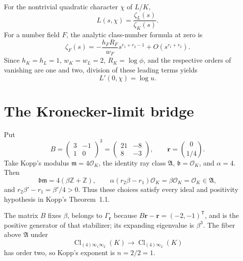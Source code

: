 \documentclass[11pt]{article}
\newcommand{\Z}{\mathbb Z}
\begin{document}
For the nontrivial quadratic character $\chi$ of $L/K$,
\[
 L(s,\chi)=\frac{\zeta_L(s)}{\zeta_K(s)}.
\]
For a number field $F$, the analytic class-number formula at zero is
\[
 \zeta_F(s)=-\frac{h_FR_F}{w_F}s^{r_1+r_2-1}
 +O(s^{r_1+r_2}).
\]
Since $h_K=h_L=1$, $w_K=w_L=2$, $R_K=\log\phi$, and the respective
orders of vanishing are one and two, division of these leading terms
yields
\[
 L'(0,\chi)=\log u.
\]

\section{The Kronecker-limit bridge}

Put
\[
 B=\begin{pmatrix}3&-1\\1&0\end{pmatrix}^{\!3}
 =\begin{pmatrix}21&-8\\8&-3\end{pmatrix},
 \qquad \boldsymbol r=\binom0{1/4}.
\]
Take Kopp's modulus $\mathfrak m=4\mathcal O_K$, the identity ray class
$\mathfrak A$, $\mathfrak b=\mathcal O_K$, and $\alpha=4$.  Then
\[
 \mathfrak b\mathfrak m
 =4(\beta\Z+\Z),\qquad
 \alpha(r_2\beta-r_1)\mathcal O_K
 =\beta\mathcal O_K=\mathcal O_K\in\mathfrak A,
\]
and $r_2\beta'-r_1=\beta'/4>0$.  Thus these choices satisfy every
ideal and positivity hypothesis in Kopp's Theorem~1.1.

The matrix $B$ fixes $\beta$, belongs to
$\Gamma_{\boldsymbol r}$ because
$B\boldsymbol r-\boldsymbol r=(-2,-1)^{\mathsf T}$, and is the positive
generator of that stabilizer; its expanding eigenvalue is $\beta^3$.
The fiber above $\mathfrak A$ under
\[
\operatorname{Cl}_{(4)\infty_1\infty_2}(K)
\longrightarrow\operatorname{Cl}_{(4)\infty_2}(K)
\]
has order two, so Kopp's exponent is $n=2/2=1$.
\end{document}
